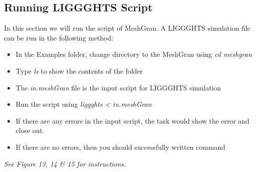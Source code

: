 \documentclass{tufte-book} %
\begin{document}
\subsection{Running LIGGGHTS Script}



 In this section we will run the script of MeshGran. A LIGGGHTS simulation file can be run in the following method:
\begin{itemize}
 \item In the Examples folder, change directory to the MeshGran using \textit{\emph{cd meshgran}}
 \item Type \textit{\emph{ls}} to show the contents of the folder
 \item The \textit{\emph{in.meshGran}} file is the input script for LIGGGHTS simulation
 \item Run the script using \textit{\emph{liggghts < in.meshGran}}
 \item If there are any errors in the input script, the task would show the error and close out. 
 \item If there are no errors, then you should successfully written command
 \end{itemize}

\emph{ See Figure 13, 14 \& 15 for instructions. }
\end{document}
